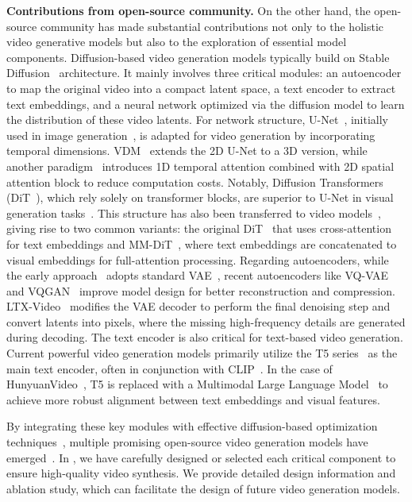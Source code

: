 \textbf{Contributions from open-source community.}
On the other hand, the open-source community has made substantial contributions not only to the holistic video generative models but also to the exploration of essential model components. Diffusion-based video generation models typically build on Stable Diffusion~\citep{rombach2022sd} architecture. It mainly involves three critical modules: an autoencoder to map the original video into a compact latent space, a text encoder to extract text embeddings, and a neural network optimized via the diffusion model to learn the distribution of these video latents.
For network structure, U-Net~\citep{ronneberger2015u}, initially used in image generation~\citep{ho2020denoising,song2020denoising}, is adapted for video generation by incorporating temporal dimensions.
VDM~\citep{ho2022video} extends the 2D U-Net to a 3D version, while another paradigm~\citep{zhou2022magicvideo,wang2023modelscope,guo2023animatediff} introduces 1D temporal attention combined with 2D spatial attention block to reduce computation costs. Notably, Diffusion Transformers (DiT~\citep{dit}), which rely solely on transformer blocks, are superior to U-Net in visual generation tasks~\citep{chen2023pixartalpha}. This structure has also been transferred to video models~\citep{ma2024latte}, giving rise to two common variants: the original DiT~\citep{dit,HaCohen2024LTXVideo} that uses cross-attention for text embeddings and MM-DiT~\citep{genmo2024mochi,kong2024hunyuanvideo}, where text embeddings are concatenated to visual embeddings for full-attention processing.
Regarding autoencoders,
while the early approach~\citep{rombach2022sd} adopts standard VAE~\citep{kingma2013auto}, recent autoencoders like VQ-VAE~\citep{van2017neural} and VQGAN~\citep{esser2020taming} improve model design for better reconstruction and compression. LTX-Video~\citep{HaCohen2024LTXVideo} modifies the VAE decoder to perform the final denoising step and convert latents into pixels, where the missing high-frequency details are generated during decoding. The text encoder is also critical for text-based video generation. Current powerful video generation models primarily utilize the T5 series~\citep{t5} as the main text encoder, often in conjunction with CLIP~\citep{radford2021learning}.
In the case of HunyuanVideo~\citep{kong2024hunyuanvideo}, T5 is replaced with a Multimodal Large Language Model~\citep{llava,li2024mgm} to achieve more robust alignment between text embeddings and visual features.

By integrating these key modules with effective diffusion-based optimization techniques~\citep{ho2020denoising,song2019generative,flow-matching}, multiple promising open-source video generation models have emerged~\citep{genmo2024mochi,kong2024hunyuanvideo,HaCohen2024LTXVideo,opensora,lin2024open,jin2024pyramidal,cogvideox}.
In \method, we have carefully designed or selected each critical component to ensure high-quality video synthesis.
We provide detailed design information and ablation study, which can facilitate the design of future video generation models.


